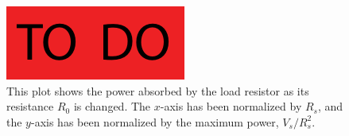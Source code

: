 \begin{figure}
   \centering
  \includegraphics{figures/toDo}
  \caption{This plot shows the power absorbed by the load resistor as its resistance $R_0$ is changed.  The $x$-axis has been normalized by $R_s$, and the $y$-axis has been normalized by the maximum power, $V_s/R_s^2$.}
  \label{fig:maxPower}
\end{figure}
